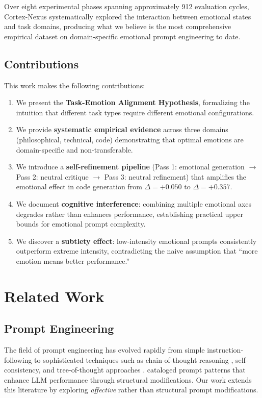 \documentclass[lineno]{wlpeerj}
\begin{document}
Over eight experimental phases spanning approximately 912 evaluation cycles, Cortex-Nexus systematically explored the interaction between emotional states and task domains, producing what we believe is the most comprehensive empirical dataset on domain-specific emotional prompt engineering to date.

\subsection{Contributions}

This work makes the following contributions:

\begin{enumerate}
    \item We present the \textbf{Task-Emotion Alignment Hypothesis}, formalizing the intuition that different task types require different emotional configurations.
    \item We provide \textbf{systematic empirical evidence} across three domains (philosophical, technical, code) demonstrating that optimal emotions are domain-specific and non-transferable.
    \item We introduce a \textbf{self-refinement pipeline} (Pass 1: emotional generation $\rightarrow$ Pass 2: neutral critique $\rightarrow$ Pass 3: neutral refinement) that amplifies the emotional effect in code generation from $\Delta = +0.050$ to $\Delta = +0.357$.
    \item We document \textbf{cognitive interference}: combining multiple emotional axes degrades rather than enhances performance, establishing practical upper bounds for emotional prompt complexity.
    \item We discover a \textbf{subtlety effect}: low-intensity emotional prompts consistently outperform extreme intensity, contradicting the naive assumption that ``more emotion means better performance.''
\end{enumerate}

\section{Related Work}

\subsection{Prompt Engineering}

The field of prompt engineering has evolved rapidly from simple instruction-following to sophisticated techniques such as chain-of-thought reasoning \citep{wei2022chain}, self-consistency, and tree-of-thought approaches \citep{sahoo2024systematic}. \citet{white2023prompt} cataloged prompt patterns that enhance LLM performance through structural modifications. Our work extends this literature by exploring \textit{affective} rather than structural prompt modifications.
\end{document}
